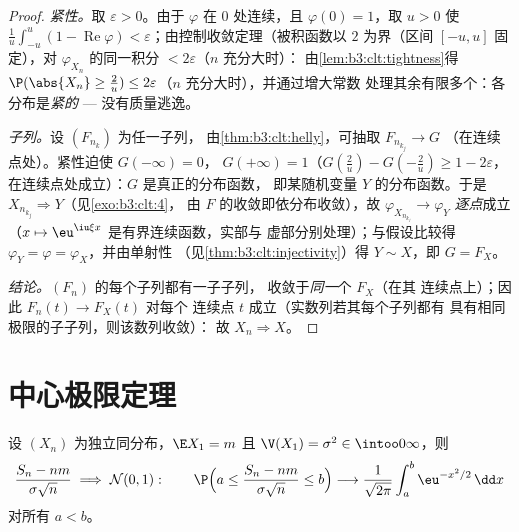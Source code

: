 \begin{proof}
\emph{紧性。}取 $\varepsilon > 0$。由于 $\varphi$ 在
$0$ 处连续，且 $\varphi(0) = 1$，取 $u > 0$ 使
$\frac1u\int_{-u}^u(1 - \operatorname{Re}\varphi) <
\varepsilon$；由控制收敛定理（被积函数以
$2$ 为界（区间 $[-u,u]$ 固定），对
$\varphi_{X_n}$ 的同一积分 $< 2\varepsilon$（$n$ 充分大时）：
由\cref{lem:b3:clt:tightness}得 $\P(\abs{X_n} \geq \frac2u)
\leq 2\varepsilon$（$n$ 充分大时），并通过增大常数
处理其余有限多个：各分布是\emph{紧的}
--- 没有质量逃逸。

\emph{子列。}设 $(F_{n_k})$ 为任一子列，
由\cref{thm:b3:clt:helly}，可抽取 $F_{n_{k_j}} \to G$
（在连续点处）。紧性迫使 $G(-\infty) = 0$，
$G(+\infty) = 1$（$G(\frac2u) - G(-\frac2u) \geq 1 -
2\varepsilon$，在连续点处成立）：$G$ 是真正的分布函数，
即某随机变量 $Y$ 的分布函数。于是
$X_{n_{k_j}} \Rightarrow Y$（见\cref{exo:b3:clt:4}，
由 $F$ 的收敛即依分布收敛），故
$\varphi_{X_{n_{k_j}}} \to \varphi_Y$ \emph{逐点}成立（$x
\mapsto \eu^{\iu\xi x}$ 是有界连续函数，实部与
虚部分别处理）；与假设比较得
$\varphi_Y = \varphi = \varphi_X$，并由单射性
（见\cref{thm:b3:clt:injectivity}）得 $Y \sim X$，即 $G =
F_X$。

\emph{结论。}$(F_n)$ 的每个子列都有一子子列，
收敛于\emph{同一}个 $F_X$（在其
连续点上）；因此 $F_n(t) \to F_X(t)$ 对每个
连续点 $t$ 成立（实数列若其每个子列都有
具有相同极限的子子列，则该数列收敛）：
故 $X_n \Rightarrow X$。
\end{proof}

\section{中心极限定理}

\begin{theorem}[中心极限定理]\label{thm:b3:clt:clt}
设 $(X_n)$ 为独立同分布，$\E X_1 = m$ 且 $\V(X_1) =
\sigma^2 \in \intoo0\infty$，则
\[
\frac{S_n - nm}{\sigma\sqrt n} \;\Longrightarrow\; \mathcal
N(0, 1) :
\qquad
\P\Bigl(a \leq \frac{S_n - nm}{\sigma\sqrt n} \leq
b\Bigr) \longrightarrow
\frac{1}{\sqrt{2\pi}}\int_a^b\eu^{-x^2/2}\,\dd x
\]
对所有 $a < b$。
\end{theorem}

